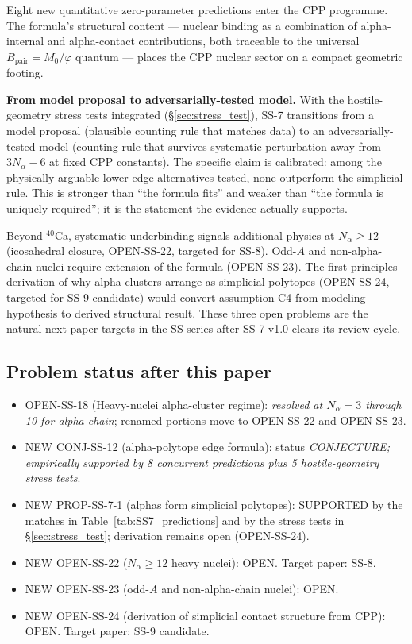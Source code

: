 \documentclass[11pt,letterpaper]{article}
\newcommand{\phig}{\varphi}
\newcommand{\Mzero}{M_0}
\newcommand{\Bpair}{B_{\mathrm{pair}}}
\newcommand{\Nalpha}{N_{\alpha}}
\begin{document}
Eight new quantitative zero-parameter predictions enter the CPP programme. The formula's structural content --- nuclear binding as a combination of alpha-internal and alpha-contact contributions, both traceable to the universal $\Bpair = \Mzero/\phig$ quantum --- places the CPP nuclear sector on a compact geometric footing.

\textbf{From model proposal to adversarially-tested model.} With the hostile-geometry stress tests integrated (\S\ref{sec:stress_test}), SS-7 transitions from a model proposal (plausible counting rule that matches data) to an adversarially-tested model (counting rule that survives systematic perturbation away from $3\Nalpha - 6$ at fixed CPP constants). The specific claim is calibrated: among the physically arguable lower-edge alternatives tested, none outperform the simplicial rule. This is stronger than ``the formula fits'' and weaker than ``the formula is uniquely required''; it is the statement the evidence actually supports.

Beyond ${}^{40}$Ca, systematic underbinding signals additional physics at $\Nalpha \geq 12$ (icosahedral closure, OPEN-SS-22, targeted for SS-8). Odd-$A$ and non-alpha-chain nuclei require extension of the formula (OPEN-SS-23). The first-principles derivation of why alpha clusters arrange as simplicial polytopes (OPEN-SS-24, targeted for SS-9 candidate) would convert assumption C4 from modeling hypothesis to derived structural result. These three open problems are the natural next-paper targets in the SS-series after SS-7 v1.0 clears its review cycle.

\subsection{Problem status after this paper}

\begin{itemize}
\item OPEN-SS-18 (Heavy-nuclei alpha-cluster regime): \emph{resolved at $\Nalpha = 3$ through 10 for alpha-chain}; renamed portions move to OPEN-SS-22 and OPEN-SS-23.
\item NEW CONJ-SS-12 (alpha-polytope edge formula): status \emph{CONJECTURE; empirically supported by 8 concurrent predictions plus 5 hostile-geometry stress tests}.
\item NEW PROP-SS-7-1 (alphas form simplicial polytopes): SUPPORTED by the matches in Table~\ref{tab:SS7_predictions} and by the stress tests in \S\ref{sec:stress_test}; derivation remains open (OPEN-SS-24).
\item NEW OPEN-SS-22 ($\Nalpha \geq 12$ heavy nuclei): OPEN. Target paper: SS-8.
\item NEW OPEN-SS-23 (odd-$A$ and non-alpha-chain nuclei): OPEN.
\item NEW OPEN-SS-24 (derivation of simplicial contact structure from CPP): OPEN. Target paper: SS-9 candidate.
\end{itemize}
\end{document}

